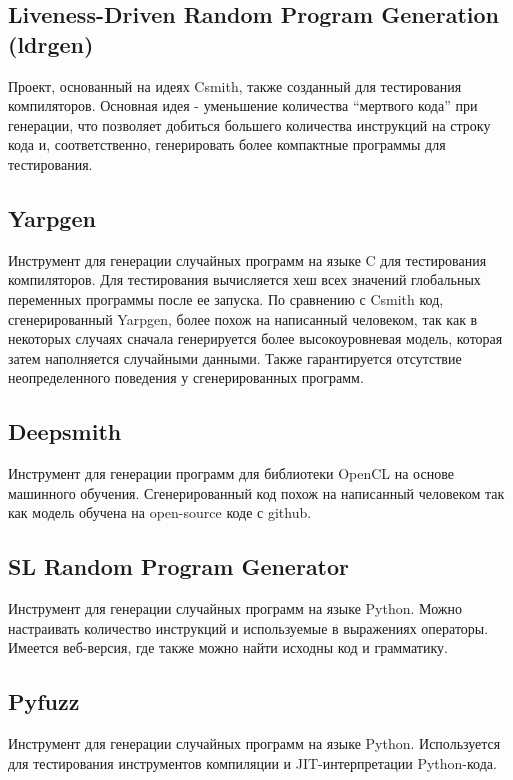 \subsection{Liveness-Driven Random Program Generation (ldrgen)}

Проект, основанный на идеях Csmith, также созданный для тестирования компиляторов.
Основная идея - уменьшение количества “мертвого кода” при генерации,
что позволяет добиться большего количества инструкций на строку кода и,
соответственно, генерировать более компактные программы для тестирования. \cite{ldrgen}


\subsection{Yarpgen}

Инструмент для генерации случайных программ на языке C для тестирования компиляторов.
Для тестирования вычисляется хеш всех значений глобальных переменных программы после ее запуска.
По сравнению с Csmith код, сгенерированный Yarpgen, более похож на написанный человеком,
так как в некоторых случаях сначала генерируется более высокоуровневая модель,
которая затем наполняется случайными данными.
Также гарантируется отсутствие неопределенного поведения у сгенерированных программ. \cite{yarpgen}

\subsection{Deepsmith}

Инструмент для генерации программ для библиотеки OpenCL на основе машинного обучения.
Сгенерированный код похож на написанный человеком так как модель обучена на open-source коде с github.
\cite{deepsmith}

\subsection{SL Random Program Generator}

Инструмент для генерации случайных программ на языке Python. Можно настраивать количество инструкций и используемые в выражениях операторы. 
Имеется веб-версия, где также можно найти исходны код и грамматику. \cite{sl}

\subsection{Pyfuzz}

Инструмент для генерации случайных программ на языке Python. Используется для тестирования
инструментов компиляции и JIT-интерпретации Python-кода. \cite{pyfuzz}

